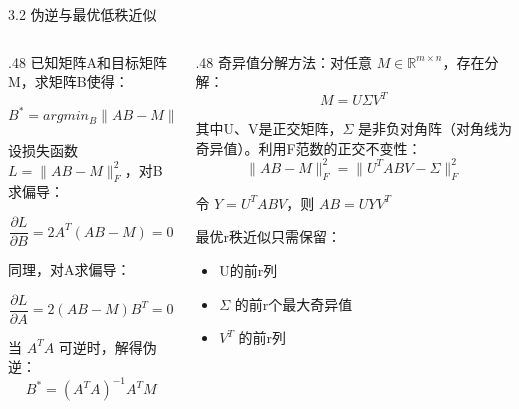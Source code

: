 \documentclass[aspectratio=169,10pt]{beamer}
\begin{document}
\begin{frame}[fragile,shrink=12]{3.2 伪逆与最优低秩近似}
\footnotesize
\begin{columns}[T,onlytextwidth]
  \begin{column}{.48\textwidth}
    已知矩阵A和目标矩阵M，求矩阵B使得：
    
    \[B^* = argmin_B \|AB - M\|_F^2\]
    
    设损失函数 \(L = \|AB - M\|_F^2\)，对B求偏导：
    
    \[\frac{\partial L}{\partial B} = 2A^T(AB - M) = 0\]
    
    同理，对A求偏导：
    
    \[\frac{\partial L}{\partial A} = 2(AB - M) B^T = 0\]
    
    当 \(A^T A\) 可逆时，解得伪逆： \[B^* = (A^T A)^{-1} A^T M\]
  \end{column}
  \begin{column}{.48\textwidth}
    奇异值分解方法：对任意 \(M \in \mathbb{R}^{m \times n}\)，存在分解： \[M = U\Sigma V^T\]
    
    其中U、V是正交矩阵，\(\Sigma\) 是非负对角阵（对角线为奇异值）。利用F范数的正交不变性： \[\|AB - M\|_F^2 = \|U^T ABV - \Sigma\|_F^2\]
    
    令 \(Y = U^T ABV\)，则 \(AB = UYV^T\)
    
    最优r秩近似只需保留：
\begin{itemize}
\item U的前r列
\item \(\Sigma\) 的前r个最大奇异值
\item \(V^T\) 的前r列
\end{itemize}
  \end{column}
\end{columns}
\end{frame}
\end{document}
